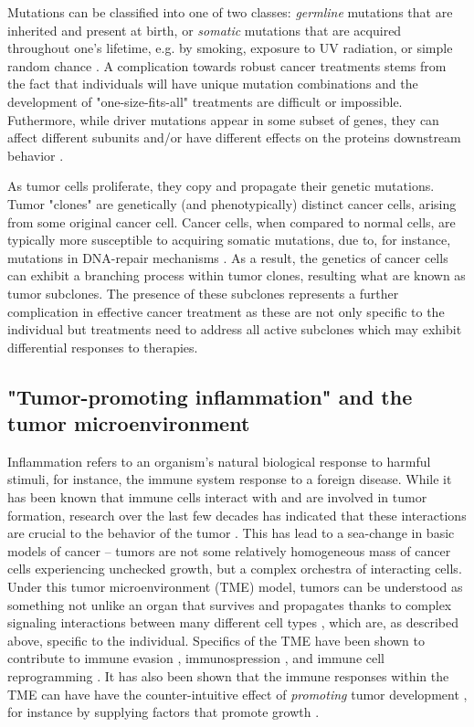 Mutations can be classified into one of two classes:
\emph{germline} mutations that are inherited and present at birth, or
\emph{somatic} mutations that are acquired throughout one's lifetime, e.g. by smoking, exposure to UV radiation, or simple random chance \cite{hanahan2011}.
A complication towards robust cancer treatments stems from the fact that individuals will have unique mutation combinations and the development of "one-size-fits-all" treatments are difficult or impossible.
Futhermore, while driver mutations appear in some subset of genes, they can affect different subunits and/or have different effects on the proteins downstream behavior \cite{smiech2020}.

As tumor cells proliferate, they copy and propagate their genetic mutations.
Tumor "clones" are genetically (and phenotypically) distinct cancer cells, arising from some original cancer cell.
Cancer cells, when compared to normal cells, are typically more susceptible to acquiring somatic mutations, due to, for instance, mutations in DNA-repair mechanisms \cite{negrini2010,salk2010}.
As a result, the genetics of cancer cells can exhibit a branching process within tumor clones, resulting what are known as tumor subclones.
The presence of these subclones represents a further complication in effective cancer treatment as these are not only specific to the individual but treatments need to address all active subclones which may exhibit differential responses to therapies.

\subsection{"Tumor-promoting inflammation" and the tumor microenvironment}
Inflammation refers to an organism's natural biological response to harmful stimuli,
for instance, the immune system response to a foreign disease.
While it has been known that immune cells interact with and are involved in tumor formation, research over the last few decades has indicated that these interactions are crucial to the behavior of the tumor \cite{grivennikov2010, quail2013}.
This has lead to a sea-change in basic models of cancer -- tumors are not some relatively homogeneous mass of cancer cells experiencing unchecked growth, but a complex orchestra of interacting cells.
Under this tumor microenvironment (TME) model, tumors can be understood as something not unlike an organ that survives and propagates thanks to complex signaling interactions between many different cell types \cite{balkwill2012}, which are, as described above, specific to the individual.
Specifics of the TME have been shown to contribute to immune evasion \cite{pansy2021},
immunospression \cite{balta2021}, and immune cell reprogramming \cite{cao2022}.
It has also been shown that the immune responses within the TME can have 
have the counter-intuitive effect of \emph{promoting} tumor development \cite{hanahan2011}, for instance by supplying factors that promote growth \cite{denardo2010}.

